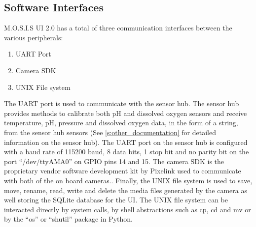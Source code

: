 \subsection{Software Interfaces}
M.O.S.I.S UI 2.0 has a total of three communication interfaces between the various peripherals:
\begin{enumerate}
\item UART Port
\item Camera SDK
\item UNIX File system
\end{enumerate}
The UART port is used to communicate with the sensor hub. The sensor hub provides methods to calibrate both pH and dissolved oxygen sensors and receive temperature, pH, pressure and dissolved oxygen data, in the form of a string, from the sensor hub sensors (See \ref{s:other_documentation} for detailed information on the sensor hub). The UART port on the sensor hub is configured with a baud rate of 115200 baud, 8 data bits, 1 stop bit and no parity bit on the port ``/dev/ttyAMA0'' on GPIO pins 14 and 15.\cite{UARTRaspberryPi} The camera SDK is the proprietary vendor software development kit by Pixelink used to communicate with both of the on board cameras.\cite{WhatFunctionsFeatures}. Finally, the UNIX file system is used to save, move, rename, read, write and delete the media files generated by the camera as well storing the SQLite database for the UI. The UNIX file system can be interacted directly by system calls, by shell abstractions such as cp, cd and mv or by the ``os'' or ``shutil'' package in Python.\cite{SystemCallsUnix}\cite{UnixShellSummary}\cite{OsMiscellaneousOperating}\cite{ShutilHighlevelFile}
